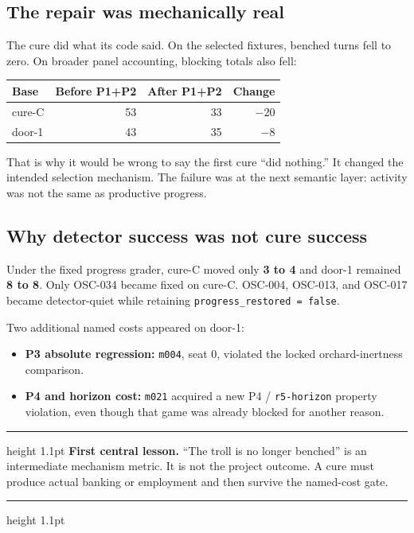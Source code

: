 \documentclass[10pt,a4paper]{article}
\newcommand{\code}[1]{\texttt{#1}}
\newenvironment{AmberBox}
  {\par\medskip\noindent\begin{minipage}{\textwidth}\color{warn}\hrule height 1.1pt\vspace{5pt}\color{ink}}
  {\vspace{2pt}\color{warn}\hrule height 1.1pt\end{minipage}\par\medskip}
\begin{document}
\subsection{The repair was mechanically real}

The cure did what its code said. On the selected fixtures, benched turns fell to zero. On broader
panel accounting, blocking totals also fell:

\begin{center}
\begin{tabular}{@{}lrrr@{}}
\toprule
\textbf{Base} & \textbf{Before P1+P2} & \textbf{After P1+P2} & \textbf{Change} \\
\midrule
cure-C & 53 & 33 & $-20$ \\
door-1 & 43 & 35 & $-8$ \\
\bottomrule
\end{tabular}
\end{center}

That is why it would be wrong to say the first cure ``did nothing.'' It changed the intended
selection mechanism. The failure was at the next semantic layer: activity was not the same as
productive progress.

\subsection{Why detector success was not cure success}

Under the fixed progress grader, cure-C moved only \textbf{3 to 4} and door-1 remained
\textbf{8 to 8}. Only OSC-034 became fixed on cure-C. OSC-004, OSC-013, and OSC-017 became
detector-quiet while retaining \code{progress\_restored = false}.

Two additional named costs appeared on door-1:

\begin{itemize}
  \item \textbf{P3 absolute regression:} \code{m004}, seat 0, violated the locked
        orchard-inertness comparison.
  \item \textbf{P4 and horizon cost:} \code{m021} acquired a new P4 / \code{r5-horizon}
        property violation, even though that game was already blocked for another reason.
\end{itemize}

\begin{AmberBox}
\textbf{First central lesson.} ``The troll is no longer benched'' is an intermediate mechanism
metric. It is not the project outcome. A cure must produce actual banking or employment and then
survive the named-cost gate.
\end{AmberBox}
\end{document}

